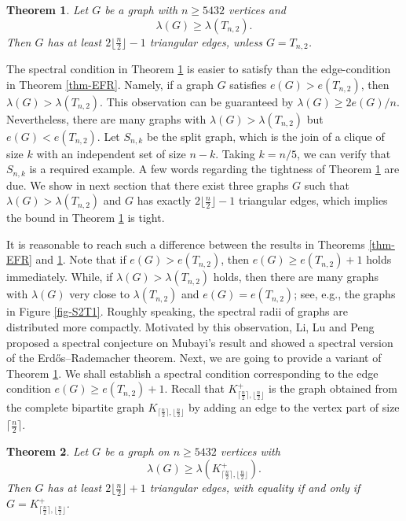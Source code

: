 \documentclass[11pt]{article}
\newtheorem{theorem}{Theorem}[section]
\begin{document}
\begin{theorem}  \label{thm-main}
Let $G$ be a graph with $n\ge 5432$ vertices and 
\[ \lambda (G) \ge \lambda (T_{n,2}).\]  
Then $G$ has at least $2 \lfloor \frac{n}{2} \rfloor -1$ 
triangular edges, unless  $G=T_{n,2}$. 
\end{theorem}


The spectral condition in Theorem \ref{thm-main}
 is easier to satisfy than the edge-condition in Theorem \ref{thm-EFR}. 
Namely, if a graph $G$ satisfies $e(G)> e(T_{n,2})$, 
then $\lambda (G) > \lambda (T_{n,2})$.  
This observation can be guaranteed by 
$\lambda (G) \ge 2e(G) /n$. Nevertheless, 
there are many graphs with $\lambda (G)> \lambda (T_{n,2})$ 
but $e(G)< e(T_{n,2})$. Let $S_{n,k}$ be the split graph, which is the join of a clique of size $k$ with an independent set of size $n-k$. Taking $k=n/5$, we can verify that 
$S_{n,k}$ is a required example. 
A few words regarding the tightness of Theorem \ref{thm-main}  
are due. 
We show in next section that 
there exist three graphs $G$ such that $\lambda (G)>
\lambda (T_{n,2})$ and $G$ has exactly 
$2 \lfloor \frac{n}{2} \rfloor -1$ triangular edges, 
which implies the bound in Theorem \ref{thm-main}  is tight.   
 
  \medskip 
It is reasonable to reach 
such a difference between the results in 
Theorems \ref{thm-EFR} and \ref{thm-main}. 
Note that if $e(G)> 
e(T_{n,2})$, then $e(G) \ge e(T_{n,2}) +1$ holds  immediately. 
While, if  $\lambda (G) > \lambda (T_{n,2})$ holds, then there are many graphs with 
 $\lambda (G)$ very close to $\lambda (T_{n,2})$ and $e(G) = e(T_{n,2})$; see, e.g., the graphs in Figure \ref{fig-S2T1}. 
Roughly speaking, the spectral radii of graphs 
are distributed more compactly.  
Motivated by this observation, 
Li, Lu and Peng \cite{LLP2024-AAM} proposed a spectral conjecture on Mubayi's result \cite{Mub2010} and showed a spectral version of the Erd\H{o}s--Rademacher theorem.  Next, we are going to  provide a variant of Theorem \ref{thm-main}. We shall establish a spectral condition 
corresponding to the edge condition 
$e(G) \ge e(T_{n,2}) +1$. 
Recall that $K_{\lceil \frac{n}{2}\rceil , \lfloor \frac{n}{2}\rfloor}^+$ is the graph obtained from the complete bipartite graph 
$K_{\lceil \frac{n}{2}\rceil , \lfloor \frac{n}{2}\rfloor}$ by adding an edge to the vertex part of size $\lceil \frac{n}{2}\rceil$. 

\begin{theorem}   \label{thm-main3}
Let $G$ be a graph on $n\ge 5432$ vertices with  
\[ \lambda (G) \ge \lambda (K_{\lceil \frac{n}{2}\rceil , \lfloor \frac{n}{2}\rfloor}^+).\]  
Then $G$ has at least $2 \lfloor \frac{n}{2} \rfloor +1$ 
triangular edges, with equality if and only if 
$G=K_{\lceil \frac{n}{2}\rceil , \lfloor \frac{n}{2}\rfloor}^+$. 
\end{theorem}
\end{document}
